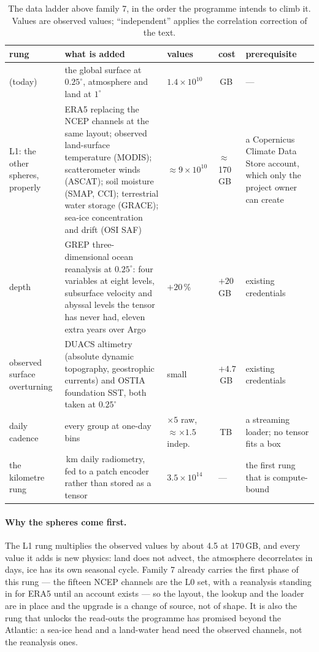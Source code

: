 \documentclass[10pt]{article}
\begin{document}
\begin{table}[h]
\centering
\setlength{\tabcolsep}{4pt}\footnotesize
\begin{tabular}{@{}>{\raggedright\arraybackslash}p{2.5cm}>{\raggedright\arraybackslash}p{5.9cm}>{\raggedright\arraybackslash}p{1.9cm}>{\raggedright\arraybackslash}p{1.2cm}>{\raggedright\arraybackslash}p{3.0cm}@{}}
\toprule
rung & what is added & values & cost & prerequisite \\
\midrule
7 (today) & the global surface at $0.25^\circ$, atmosphere and land at $1^\circ$ & $1.4\times10^{10}$ & 53\,GB & --- \\
\addlinespace
L1: the other spheres, properly & ERA5 replacing the NCEP channels at the same layout; observed land-surface temperature (MODIS); scatterometer winds (ASCAT); soil moisture (SMAP, CCI); terrestrial water storage (GRACE); sea-ice concentration and drift (OSI SAF) & $\approx9\times10^{10}$ & $\approx$170\,GB & a Copernicus Climate Data Store account, which only the project owner can create \\
\addlinespace
depth & GREP three-dimensional ocean reanalysis at $0.25^\circ$: four variables at eight levels, subsurface velocity and abyssal levels the tensor has never had, eleven extra years over Argo & $+20$\,\% & $+20$\,GB & existing credentials \\
\addlinespace
observed surface overturning & DUACS altimetry (absolute dynamic topography, geostrophic currents) and OSTIA foundation SST, both taken at $0.25^\circ$ & small & $+4.7$\,GB & existing credentials \\
\addlinespace
daily cadence & every group at one-day bins & $\times5$ raw, $\approx{\times}1.5$ indep. & 1.3\,TB & a streaming loader; no tensor fits a box \\
\addlinespace
the kilometre rung & 1\,km daily radiometry, fed to a patch encoder rather than stored as a tensor & $3.5\times10^{14}$ & --- & the first rung that is compute-bound \\
\bottomrule
\end{tabular}
\caption{The data ladder above family 7, in the order the programme intends
to climb it. Values are observed values; ``independent'' applies the
correlation correction of the text.}
\end{table}

\paragraph{Why the spheres come first.} The L1 rung multiplies the observed
values by about 4.5 at 170\,GB, and every value it adds is new physics: land
does not advect, the atmosphere decorrelates in days, ice has its own
seasonal cycle. Family 7 already carries the first phase of this rung --- the
fifteen NCEP channels are the L0 set, with a reanalysis standing in for ERA5
until an account exists --- so the layout, the lookup and the loader are in
place and the upgrade is a change of source, not of shape. It is also the
rung that unlocks the read-outs the programme has promised beyond the
Atlantic: a sea-ice head and a land-water head need the observed channels,
not the reanalysis ones.
\end{document}
